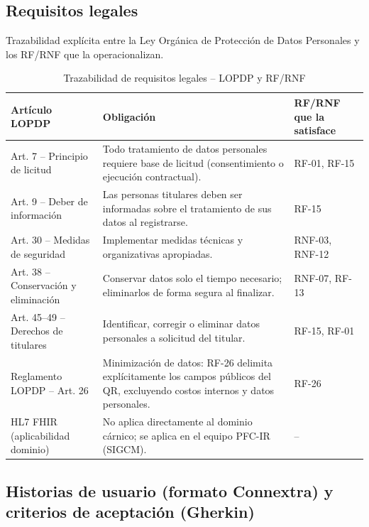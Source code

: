 \documentclass[11pt,a4paper]{article}
\begin{document}
\subsection{Requisitos legales}

Trazabilidad explícita entre la Ley Orgánica de Protección de Datos Personales \cite{lopd2021} y los RF/RNF que la operacionalizan.

\begin{longtable}{|p{2.5cm}|p{6cm}|p{5cm}|}
\caption{Trazabilidad de requisitos legales -- LOPDP y RF/RNF}\\
\hline
\textbf{Artículo LOPDP} & \textbf{Obligación} & \textbf{RF/RNF que la satisface} \\
\hline
Art. 7 -- Principio de licitud & Todo tratamiento de datos personales requiere base de licitud (consentimiento o ejecución contractual). & RF-01, RF-15 \\
\hline
Art. 9 -- Deber de información & Las personas titulares deben ser informadas sobre el tratamiento de sus datos al registrarse. & RF-15 \\
\hline
Art. 30 -- Medidas de seguridad & Implementar medidas técnicas y organizativas apropiadas. & RNF-03, RNF-12 \\
\hline
Art. 38 -- Conservación y eliminación & Conservar datos solo el tiempo necesario; eliminarlos de forma segura al finalizar. & RNF-07, RF-13 \\
\hline
Art. 45--49 -- Derechos de titulares & Identificar, corregir o eliminar datos personales a solicitud del titular. & RF-15, RF-01 \\
\hline
Reglamento LOPDP -- Art. 26 & Minimización de datos: RF-26 delimita explícitamente los campos públicos del QR, excluyendo costos internos y datos personales. & RF-26 \\
\hline
HL7 FHIR (aplicabilidad dominio) & No aplica directamente al dominio cárnico; se aplica en el equipo PFC-IR (SIGCM). & -- \\
\hline
\end{longtable}

\subsection{Historias de usuario (formato Connextra) y criterios de aceptación (Gherkin)}
\end{document}
